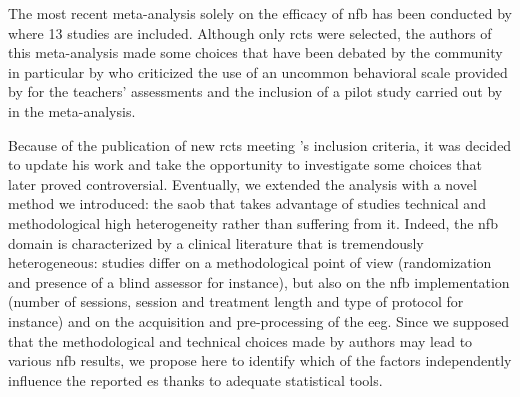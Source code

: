 The most recent meta-analysis solely on the efficacy of \gls{nfb} has been conducted by \citet{Cortese2016} where
13 studies are included. Although only \glspl{rct} were selected, the authors of 
this meta-analysis made some choices that have been debated by the community in particular by 
\citet{Micoulaud2016} who criticized the use of an uncommon behavioral scale provided by \citet{Steiner2014}
for the teachers' assessments and the inclusion of a pilot study carried out by \citet{Arnold2014} in the meta-analysis. 

Because of the publication of new \glspl{rct} meeting \citeauthor{Cortese2016}'s inclusion criteria, it was decided to update his work and take 
the opportunity to investigate some choices that later proved controversial. Eventually, we extended the analysis with a novel method we introduced:
the \gls{saob} that takes advantage of studies technical and methodological high heterogeneity rather than suffering from it. Indeed, the \gls{nfb} 
domain is characterized by a clinical literature that is tremendously heterogeneous: studies differ on a methodological 
point of view (randomization and presence of a blind assessor for instance), but also on the \gls{nfb} implementation (number of sessions,
session and treatment length and type of protocol for instance) and on the acquisition and pre-processing of the \gls{eeg}. Since we supposed that the 
methodological and technical choices made by authors may lead to various \gls{nfb} results, we propose here to identify which of the factors 
independently influence the reported \gls{es} thanks to adequate statistical tools.






